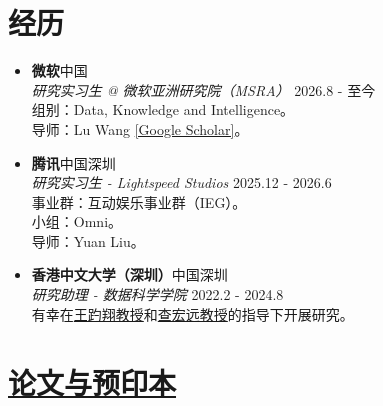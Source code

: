 \documentclass[a4paper,20pt]{article}
\newcommand{\resumeSubheading}[5]{
  \item \textbf{#1}{\hfill #2} \\
        #3 \hfill #4 \\
        #5
}
\newcommand{\resumeSubHeadingListStart}{\begin{itemize}[leftmargin=*]}
\newcommand{\resumeSubHeadingListEnd}{\end{itemize}}
\begin{document}
\section{经历}
\vspace{3pt}

\resumeSubHeadingListStart
    \resumeSubheading{微软}{中国}
    {\textit{研究实习生 @ 微软亚洲研究院（MSRA）}}{2026.8 - 至今}
    {组别：Data, Knowledge and Intelligence。\\
    导师：Lu Wang \href{https://scholar.google.com/citations?user=hqlU92YAAAAJ}{[Google Scholar]}。}
    \resumeSubheading{腾讯}{中国深圳}
    {\textit{研究实习生 - Lightspeed Studios}}{2025.12 - 2026.6}
    {事业群：互动娱乐事业群（IEG）。\\
    小组：Omni。\\
    导师：Yuan Liu。}
    \resumeSubheading{香港中文大学（深圳）}{中国深圳}
    {\textit{研究助理 - 数据科学学院}}{2022.2 - 2024.8}
    {有幸在\href{https://bxiangwang.github.io/}{王趵翔教授}和\href{https://scholar.google.com/citations?user=n1DQMIsAAAAJ&hl=en&oi=ao}{查宏远教授}的指导下开展研究。}
\resumeSubHeadingListEnd

\vspace{5pt}
\section{\href{https://scholar.google.com/citations?user=fbvQHX4AAAAJ&hl=zh-CN&oi=sra}{论文与预印本}}
\vspace{3pt}
\end{document}
